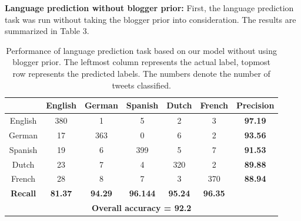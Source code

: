 \documentclass[11pt]{article}
\begin{document}
{\textbf {Language prediction without blogger prior: }}  First, the language prediction task was run without taking the blogger prior into consideration. The results are summarized in Table 3.


\begin{table}
\begin{center}
\small
\begin{tabular}{|c|c|c|c|c|c|c|}
\hline
\textbf{} & \textbf{English} & \textbf {German} & \textbf{Spanish} & \textbf{Dutch} & \textbf{French} & \textbf{Precision} \\
\hline
English    &        380       &       1          &        5         &       2        &        3        &      \textbf{97.19} \\
German     &         17       &     363          &        0         &       6        &        2        &      \textbf{93.56} \\
Spanish    &         19       &       6          &      399         &       5        &        7        &      \textbf{91.53} \\
Dutch      &         23       &       7          &        4         &     320        &        2        &      \textbf{89.88} \\
French     &         28       &       8          &        7         &       3        &      370        &      \textbf{88.94} \\
\hline
\textbf{Recall}&\textbf{81.37}& \textbf{94.29}   & \textbf{96.144}  & \textbf{95.24} & \textbf{96.35}  &      \textbf{} \\
\hline
\multicolumn{7}{|c|}{\textbf{Overall accuracy = 92.2}} \\\hline
\end{tabular}
\caption{\footnotesize Performance of language prediction task based on our model without using blogger prior. The leftmost column represents the actual label, topmost row represents the predicted labels. The numbers denote the number of tweets classified.}
\end{center}
\end{table}
\end{document}
